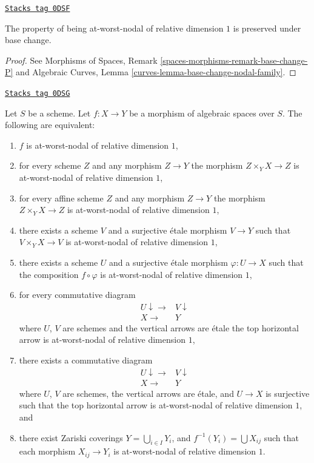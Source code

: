 \begin{lemma}
\label{spaces-more-morphisms-lemma-base-change-nodal}
\href{https://stacks.math.columbia.edu/tag/0DSF}{\texttt{Stacks tag 0DSF}}

The property of being at-worst-nodal of relative dimension $1$
is preserved under base change.
\end{lemma}

\begin{proof}
See
Morphisms of Spaces, Remark \ref{spaces-morphisms-remark-base-change-P}
and
Algebraic Curves, Lemma \ref{curves-lemma-base-change-nodal-family}.
\end{proof}

\begin{lemma}
\label{spaces-more-morphisms-lemma-nodal-local}
\href{https://stacks.math.columbia.edu/tag/0DSG}{\texttt{Stacks tag 0DSG}}

Let $S$ be a scheme.
Let $f : X \to Y$ be a morphism of algebraic spaces over $S$.
The following are equivalent:
\begin{enumerate}
\item $f$ is at-worst-nodal of relative dimension $1$,
\item for every scheme $Z$ and any morphism $Z \to Y$ the morphism
$Z \times_Y X \to Z$ is at-worst-nodal of relative dimension $1$,
\item for every affine scheme $Z$ and any morphism
$Z \to Y$ the morphism $Z \times_Y X \to Z$ is
at-worst-nodal of relative dimension $1$,
\item there exists a scheme $V$ and a surjective \'etale morphism
$V \to Y$ such that $V \times_Y X \to V$ is
at-worst-nodal of relative dimension $1$,
\item there exists a scheme $U$ and a surjective \'etale morphism
$\varphi : U \to X$ such that the composition $f \circ \varphi$
is at-worst-nodal of relative dimension $1$,
\item for every commutative diagram
$$
\begin{array}{cc}U \downarrow\longrightarrow & V \downarrow \\ X \longrightarrow & Y\end{array}
$$
where $U$, $V$ are schemes and the vertical arrows are \'etale
the top horizontal arrow is at-worst-nodal of relative dimension $1$,
\item there exists a commutative diagram
$$
\begin{array}{cc}U \downarrow\longrightarrow & V \downarrow \\ X \longrightarrow & Y\end{array}
$$
where $U$, $V$ are schemes, the vertical arrows are \'etale, and
$U \to X$ is surjective such that the top horizontal arrow is
at-worst-nodal of relative dimension $1$, and
\item there exist Zariski coverings $Y = \bigcup_{i \in I} Y_i$,
and $f^{-1}(Y_i) = \bigcup X_{ij}$ such that
each morphism $X_{ij} \to Y_i$ is
at-worst-nodal of relative dimension $1$.
\end{enumerate}
\end{lemma}

